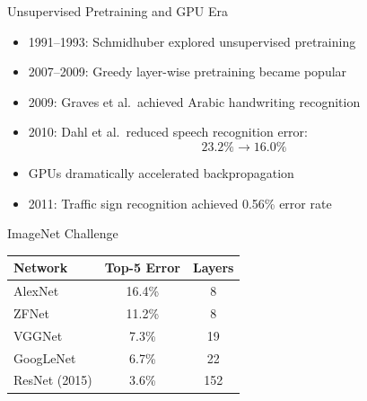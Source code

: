 \documentclass{beamer}
\begin{document}

\begin{frame}{Unsupervised Pretraining and GPU Era}

\begin{itemize}

\item 1991--1993: Schmidhuber explored unsupervised pretraining

\item 2007--2009: Greedy layer-wise pretraining became popular

\item 2009: Graves et al.\ achieved Arabic handwriting recognition

\item 2010: Dahl et al.\ reduced speech recognition error:
\[
23.2\% \rightarrow 16.0\%
\]

\item GPUs dramatically accelerated backpropagation

\item 2011: Traffic sign recognition achieved 0.56\% error rate

\end{itemize}

\end{frame}


\begin{frame}{ImageNet Challenge}

\begin{center}

\begin{tabular}{lcc}
\toprule
\textbf{Network} & \textbf{Top-5 Error} & \textbf{Layers} \\
\midrule
AlexNet & 16.4\% & 8 \\
ZFNet & 11.2\% & 8 \\
VGGNet & 7.3\% & 19 \\
GoogLeNet & 6.7\% & 22 \\
ResNet (2015) & 3.6\% & 152 \\
\bottomrule
\end{tabular}

\end{center}

\end{frame}

\end{document}
